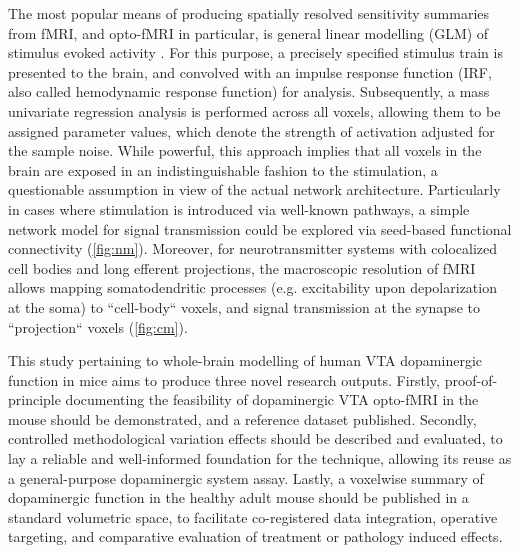 The most popular means of producing spatially resolved sensitivity summaries from fMRI, and opto-fMRI in particular, is general linear modelling (GLM) of stimulus evoked activity \cite{Friston1995}.
For this purpose, a precisely specified stimulus train is presented to the brain, and convolved with an impulse response function (IRF, also called hemodynamic response function) for analysis.
Subsequently, a mass univariate regression analysis is performed across all voxels, allowing them to be assigned parameter values, which denote the strength of activation adjusted for the sample noise.
While powerful, this approach implies that all voxels in the brain are exposed in an indistinguishable fashion to the stimulation, a questionable assumption in view of the actual network architecture.
Particularly in cases where stimulation is introduced via well-known pathways, a simple network model for signal transmission could be explored via seed-based functional connectivity (\cref{fig:nm}).
Moreover, for neurotransmitter systems with colocalized cell bodies and long efferent projections, the macroscopic resolution of fMRI allows mapping somatodendritic processes (e.g. excitability upon depolarization at the soma) to “cell-body“ voxels, and signal transmission at the synapse to “projection“ voxels (\cref{fig:cm}).

This study pertaining to whole-brain modelling of human VTA dopaminergic function in mice aims to produce three novel research outputs.
Firstly, proof-of-principle documenting the feasibility of dopaminergic VTA opto-fMRI in the mouse should be demonstrated, and a reference dataset published.
Secondly, controlled methodological variation effects should be described and evaluated, to lay a reliable and well-informed foundation for the technique, allowing its reuse as a general-purpose dopaminergic system assay.
Lastly, a voxelwise summary of dopaminergic function in the healthy adult mouse should be published in a standard volumetric space, to facilitate co-registered data integration, operative targeting, and comparative evaluation of treatment or pathology induced effects.
